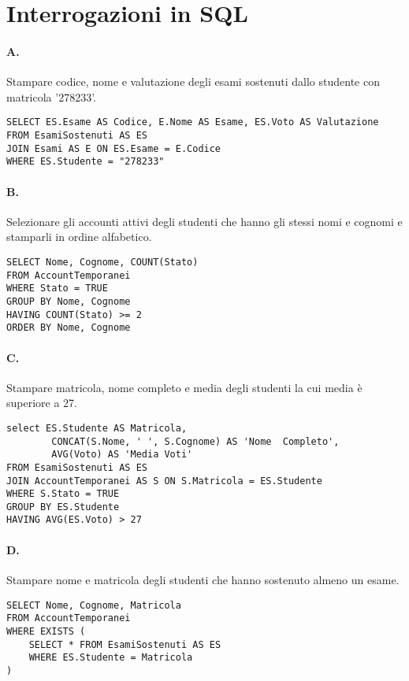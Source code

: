 \section{Interrogazioni in SQL}

\paragraph{A.}
Stampare codice, nome e valutazione degli esami sostenuti dallo
studente con matricola '278233'.

\begin{verbatim}
SELECT ES.Esame AS Codice, E.Nome AS Esame, ES.Voto AS Valutazione
FROM EsamiSostenuti AS ES
JOIN Esami AS E ON ES.Esame = E.Codice
WHERE ES.Studente = "278233"
\end{verbatim}

\paragraph{B.}
Selezionare gli accounti attivi degli studenti che hanno gli
stessi nomi e cognomi e stamparli in ordine alfabetico.

\begin{verbatim}
SELECT Nome, Cognome, COUNT(Stato)
FROM AccountTemporanei
WHERE Stato = TRUE
GROUP BY Nome, Cognome
HAVING COUNT(Stato) >= 2
ORDER BY Nome, Cognome
\end{verbatim}

\paragraph{C.}
Stampare matricola, nome completo e media degli studenti la cui
media è superiore a 27.

\begin{verbatim}
select ES.Studente AS Matricola, 
        CONCAT(S.Nome, ' ', S.Cognome) AS 'Nome  Completo',
        AVG(Voto) AS 'Media Voti'
FROM EsamiSostenuti AS ES
JOIN AccountTemporanei AS S ON S.Matricola = ES.Studente
WHERE S.Stato = TRUE
GROUP BY ES.Studente
HAVING AVG(ES.Voto) > 27
\end{verbatim}

\paragraph{D.}
Stampare nome e matricola degli studenti che hanno sostenuto
almeno un esame.

\begin{verbatim}
SELECT Nome, Cognome, Matricola
FROM AccountTemporanei
WHERE EXISTS (
    SELECT * FROM EsamiSostenuti AS ES
    WHERE ES.Studente = Matricola
)
\end{verbatim}

